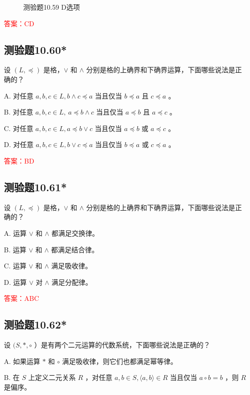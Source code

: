 \documentclass[UTF8, heading=true]{ctexart}
\begin{document}
\begin{figure}[H]
\begin{minipage}[t]{0.2\textwidth}
      \vspace{-0.3cm}
      \caption{测验题10.59 D选项}
\end{minipage}
\end{figure}

\textcolor{red}{答案：CD}


\subsection{测验题10.60*}

设 $(L, \preceq)$ 是格，$\vee$ 和 $\wedge$ 分别是格的上确界和下确界运算，下面哪些说法是正确的？

A. 对任意 $a, b, c \in L,  b \wedge c \preceq a$ 当且仅当 $b \preceq a$ 且 $c \preceq a$ 。

B. 对任意 $a, b, c \in L, ~ a \preceq b \wedge c$ 当且仅当 $a \preceq b$ 且 $a \preceq c$ 。

C. 对任意 $a, b, c \in L, a \preceq b \vee c$ 当且仅当 $a \preceq b$ 或 $a \preceq c$ 。

D. 对任意 $a, b, c \in L,  b \vee c \preceq a$ 当且仅当 $b \preceq a$ 或 $c \preceq a$ 。

\textcolor{red}{答案：BD}

\subsection{测验题10.61*}

设 $(L, \preceq)$ 是格，$\vee$ 和 $\wedge$ 分别是格的上确界和下确界运算，下面哪些说法是正确的？

A. 运算 $\vee$ 和 $\wedge$ 都满足交换律。

B. 运算 $\vee$ 和 $\wedge$ 都满足结合律。

C. 运算 $\vee$ 和 $\wedge$ 满足吸收律。

D. 运算 $\vee$ 对 $\wedge$ 满足分配律。

\textcolor{red}{答案：ABC}

\subsection{测验题10.62*}

设 $(S, *, \circ$ ）是有两个二元运算的代数系统，下面哪些说法是正确的？

A. 如果运算 $*$ 和 $\circ$ 满足吸收律，则它们也都满足幂等律。

B. 在 $S$ 上定义二元关系 $R$ ，对任意 $a, b \in S,\langle a, b\rangle \in R$ 当且仅当 $a \circ b=b$ ，则 $R$ 是偏序。
\end{document}
